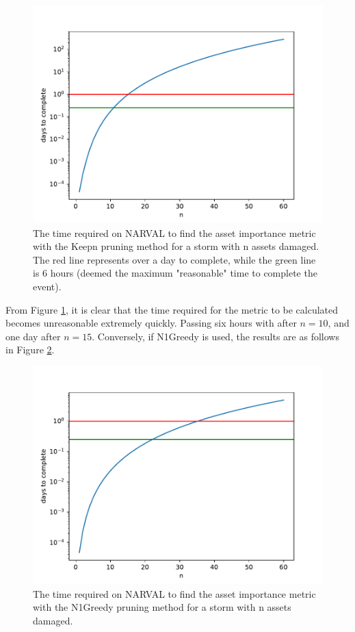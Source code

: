 \documentclass[12pt]{article}
\begin{document}
\begin{figure}[ht]
    \centering %
    \includegraphics[width=\textwidth]{Keepnnumsims.pdf}
    \caption[Time required to find importance metric with Keepn]{The time required on NARVAL to find the asset importance metric with the Keepn pruning method for a storm with n assets damaged. The red line represents over a day to complete, while the green line is 6 hours (deemed the maximum "reasonable" time to complete the event).}
    \label{fig:Keepnnumsims}
\end{figure}

From Figure \ref{fig:Keepnnumsims}, it is clear that the time required for the metric to be calculated becomes unreasonable extremely quickly. Passing six hours with after $n = 10$, and one day after $n = 15$. Conversely, if N1Greedy is used, the results are as follows in Figure \ref{fig:Keep1numsims}. \par


\begin{figure}[ht]
    \centering %
    \includegraphics[width=\textwidth]{Keep1numsims.pdf}
    \caption[Time required to find importance metric with N1Greedy]{The time required on NARVAL to find the asset importance metric with the N1Greedy pruning method for a storm with n assets damaged.}
    \label{fig:Keep1numsims}
\end{figure}
\end{document}
